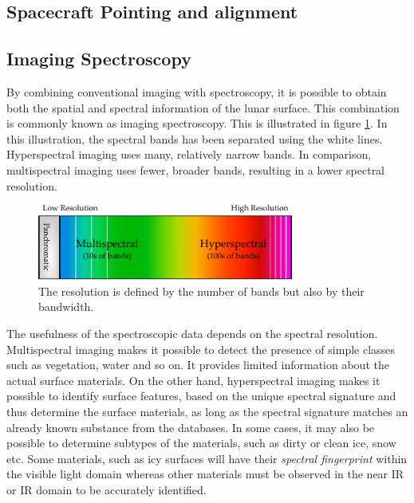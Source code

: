 \subsection{Spacecraft Pointing and alignment}
\subsection{Imaging Spectroscopy}\label{sec:imaging_spectroscopy}
By combining conventional imaging with spectroscopy, it is possible to obtain both the spatial and spectral information of the lunar surface. This combination is commonly known as imaging spectroscopy. This is illustrated in figure \ref{fig:spectral_information}. In this illustration, the spectral bands has been separated using the white lines. Hyperspectral imaging uses many, relatively narrow bands. In comparison, multispectral imaging uses fewer, broader bands, resulting in a lower spectral resolution. 
\begin{figure}[H]
\centering
\includegraphics[width=0.75\textwidth]{figures/Orbiter/spectral_information}
\caption{The resolution is defined by the number of bands but also by their bandwidth.}
\label{fig:spectral_information}
\end{figure}
The usefulness of the spectroscopic data depends on the spectral resolution\cite{elowitz2016}. Multispectral imaging makes it possible to detect the presence of simple classes such as vegetation, water and so on. It provides limited information about the actual surface materials. On the other hand, hyperspectral imaging makes it possible to identify surface features, based on the unique spectral signature and thus determine the surface materials, as long as the spectral signature matches an already known substance from the databases. In some cases, it may also be possible to determine subtypes of the materials, such as dirty or clean ice, snow etc\cite{naegeli2015a}. Some materials, such as icy surfaces will have their \textit{spectral fingerprint} within the visible light domain whereas other materials must be observed in the near IR or IR domain to be accurately identified.

